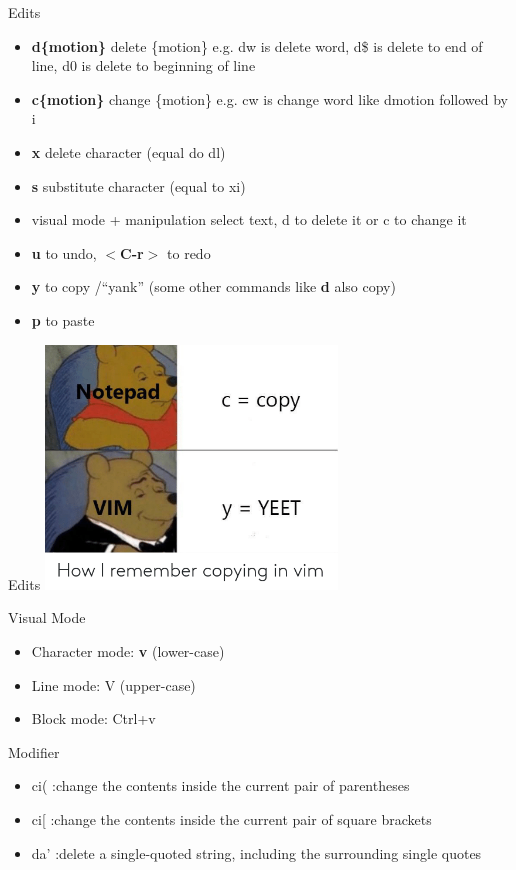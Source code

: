 \documentclass[10pt]{beamer}
\begin{document}
\begin{frame}{Edits}
\begin{itemize}
  \item \textbf{d\{motion\}} delete \{motion\}
  e.g. dw is delete word, d\$ is delete to end of line, d0 is delete to beginning of line
  \item \textbf{c\{motion\}} change \{motion\}
  e.g. cw is change word
  like d{motion} followed by i
  \item \textbf{x} delete character (equal do dl)
  \item \textbf{s} substitute character (equal to xi)
  \item visual mode + manipulation
  select text, d to delete it or c to change it
  \item \textbf{u} to undo, \textbf{$<$C-r$>$} to redo
  \item \textbf{y} to copy /“yank” (some other commands like \textbf{d} also copy)
  \item \textbf{p} to paste
\end{itemize}
\end{frame}

\begin{frame}{Edits}
  \includegraphics[width=220pt]{yank.png}
\end{frame}

\begin{frame}{Visual Mode}
  \begin{itemize}
    \item Character mode: \textbf{v} (lower-case)
    \item Line mode: V (upper-case)
    \item Block mode: Ctrl+v
  \end{itemize}

\end{frame}

\begin{frame}{Modifier}
\begin{itemize}
  \item ci( :change the contents inside the current pair of parentheses
  \item ci[ :change the contents inside the current pair of square brackets
  \item da' :delete a single-quoted string, including the surrounding single quotes
\end{itemize}
\end{frame}
\end{document}
